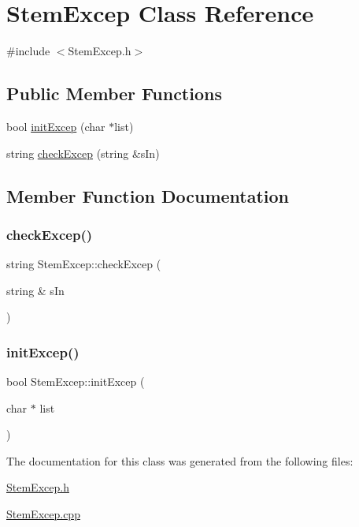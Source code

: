 \hypertarget{class_stem_excep}{}\section{Stem\+Excep Class Reference}
\label{class_stem_excep}


{\ttfamily \#include $<$Stem\+Excep.\+h$>$}

\subsection*{Public Member Functions}
\begin{DoxyCompactItemize}
\item 
bool \hyperlink{class_stem_excep_af299d8cdb629c50ba442581d9ec3a7af}{init\+Excep} (char $\ast$list)
\item 
string \hyperlink{class_stem_excep_a268b9877c10cc4e5d1d4777b09fb3f74}{check\+Excep} (string \&s\+In)
\end{DoxyCompactItemize}


\subsection{Member Function Documentation}
\mbox{\label{class_stem_excep_a268b9877c10cc4e5d1d4777b09fb3f74}} 
\subsubsection{\texorpdfstring{check\+Excep()}{checkExcep()}}
{\footnotesize\ttfamily string Stem\+Excep\+::check\+Excep (\begin{DoxyParamCaption}\item[{string \&}]{s\+In }\end{DoxyParamCaption})}

\mbox{\label{class_stem_excep_af299d8cdb629c50ba442581d9ec3a7af}} 
\subsubsection{\texorpdfstring{init\+Excep()}{initExcep()}}
{\footnotesize\ttfamily bool Stem\+Excep\+::init\+Excep (\begin{DoxyParamCaption}\item[{char $\ast$}]{list }\end{DoxyParamCaption})}



The documentation for this class was generated from the following files\+:\begin{DoxyCompactItemize}
\item 
\hyperlink{_stem_excep_8h}{Stem\+Excep.\+h}\item 
\hyperlink{_stem_excep_8cpp}{Stem\+Excep.\+cpp}\end{DoxyCompactItemize}
